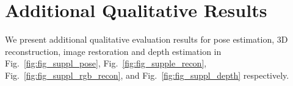 
\section{Additional Qualitative Results}
We present additional qualitative evaluation results for pose estimation, 3D reconstruction, image restoration and depth estimation in Fig.~\ref{fig:fig_suppl_pose}, Fig.~\ref{fig:fig_supple_recon}, Fig.~\ref{fig:fig_suppl_rgb_recon}, and Fig.~\ref{fig:fig_suppl_depth} respectively.

\clearpage
\vspace*{\fill}

\vfill

\vspace*{\fill}
\clearpage

\clearpage
\vspace*{\fill}

\vspace*{\fill}
\clearpage

\clearpage
\vspace*{\fill}

\vspace*{\fill}
\clearpage

